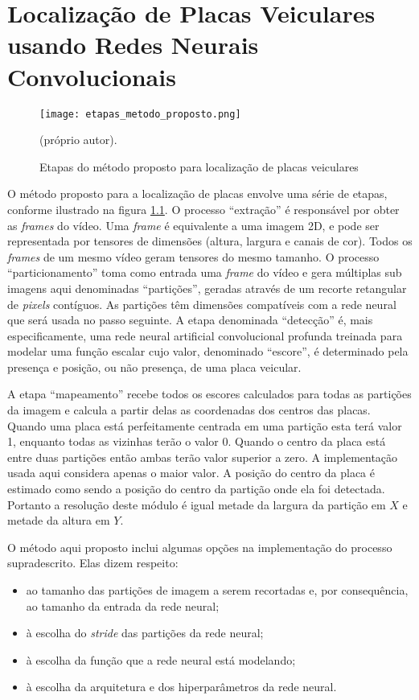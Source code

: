 \chapter{Localização de Placas Veiculares usando Redes Neurais Convolucionais}
	\label{ses:metodo}

\begin{figure}[!htb]
	\centering
	\texttt{[image: etapas\_metodo\_proposto.png]}
	\caption{Etapas do método proposto para localização de placas veiculares}
	\label{fig:etapas_metodo_proposto}
	(próprio autor).
\end{figure}

O método proposto para a localização de placas envolve uma série de etapas,
conforme ilustrado na figura \ref{fig:etapas_metodo_proposto}.
O processo ``extração'' é responsável por obter as \emph{frames} do vídeo.
Uma \emph{frame} é equivalente a uma imagem 2D, e pode ser representada por
tensores de dimensões  (altura, largura e canais de cor). Todos os \emph{frames} de um mesmo
vídeo geram tensores do mesmo tamanho.
O processo ``particionamento'' toma como entrada uma \emph{frame} do
vídeo e gera
múltiplas sub imagens aqui denominadas ``partições'', geradas através de um
recorte retangular de \emph{pixels} contíguos. As partições têm dimensões
compatíveis com a rede neural que será usada no passo seguinte.
A etapa denominada ``detecção'' é, mais especificamente, uma rede neural
artificial convolucional profunda treinada para modelar uma função escalar cujo
valor, denominado ``escore'', é determinado pela presença e posição, ou não
presença, de uma placa veicular.

A etapa ``mapeamento'' recebe todos os escores calculados para todas as
partições da imagem e calcula a partir delas as coordenadas dos centros das
placas. Quando uma placa está perfeitamente centrada em uma partição esta terá
valor 1, enquanto todas as vizinhas terão o valor 0. Quando o centro da placa
está entre duas partições então ambas terão valor superior a zero. A
implementação usada aqui considera apenas o maior valor. A posição do centro da
placa é estimado como sendo a posição do centro da partição onde ela foi
detectada. Portanto a resolução deste módulo é igual metade da largura da
partição em $X$ e metade da altura em $Y$.

O método aqui proposto inclui algumas opções na implementação do processo
supradescrito. Elas dizem respeito:

\begin{itemize}
\item ao tamanho das partições de imagem a serem recortadas e, por
	consequência, ao tamanho da entrada da rede neural;
\item à escolha do \emph{stride} das partições da rede neural;
\item à escolha da função que a rede neural está modelando;
\item à escolha da arquitetura e dos hiperparâmetros da rede neural.
\end{itemize}


